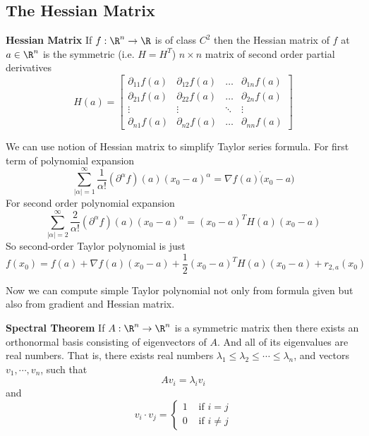\documentclass[11pt]{article}
\begin{document}
\subsection{The Hessian Matrix}

\begin{defn}
  \label{Hessian Matrix}\textbf{Hessian Matrix} If $f:\R^n \rightarrow \R$ is of class $C^2$ then the Hessian matrix of $f$ at $a\in\R^n$ is the symmetric (i.e. $H = H^T$) $n\times n$ matrix of second order partial derivatives
  \[
    H(a) =
    \begin{bmatrix}
      \partial_{11}f(a) & \partial_{12} f(a) & \dots  & \partial_{1n} f(a) \\
      \partial_{21}f(a) & \partial_{22} f(a) & \dots  & \partial_{2n} f(a) \\
      \vdots & \vdots & \ddots & \vdots \\
      \partial_{n1} f(a) & \partial_{n2} f(a) & \dots  & \partial_{nn} f(a)
    \end{bmatrix}
  \]
  \begin{rem}
    We can use notion of Hessian matrix to simplify Taylor series formula. For first term of polynomial expansion
    \[
      \sum_{|\alpha|=1}^{\infty} \frac{1}{\alpha!}(\partial^{\alpha}f)(a) (x_0 - a)^{\alpha} = \nabla f(a) \dot (x_0 - a)
    \]
    For second order polynomial expansion
    \[
      \sum_{|\alpha|=2}^{\infty} \frac{2}{\alpha!}(\partial^{\alpha}f)(a) (x_0 - a)^{\alpha} = (x_0-a)^T H(a) (x_0-a)
    \]
    So second-order Taylor polynomial is just
    \[
      f(x_0) = f(a) + \nabla f(a) (x_0-a) + \frac{1}{2} (x_0-a)^T H(a) (x_0-a) + r_{2, a} (x_0)
    \]
  \end{rem}
  Now we can compute simple Taylor polynomial not only from formula given but also from gradient and Hessian matrix.
\end{defn}

\begin{theorem}
  \label{Spectral Theorem} \textbf{Spectral Theorem} If $A: \R^n \rightarrow \R^n$ is a symmetric matrix then there exists an orthonormal basis consisting of eigenvectors of $A$. And all of its eigenvalues are real numbers. That is, there exists real numbers $\lambda_1 \leq \lambda_2 \leq \cdots \leq \lambda_n$, and vectors $v_1, \cdots, v_n$, such that
  \[
    Av_i =  \lambda_i v_i
  \]
  and
  \[
    v_i \cdot v_j =
    \begin{cases}
      1 & \text{ if } i = j \\
      0 & \text{ if } i\neq j
    \end{cases}
  \]
\end{theorem}
\end{document}

